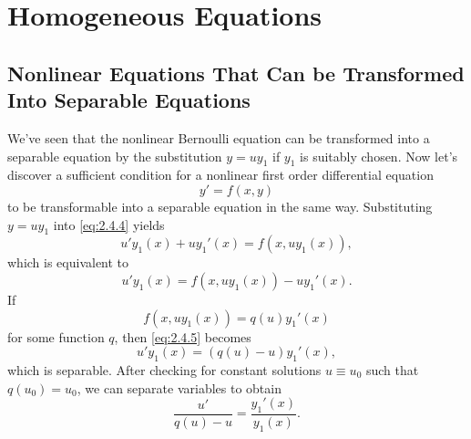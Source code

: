 \documentclass{ximera}
\begin{document}





\section*{Homogeneous Equations}
\subsection*{Nonlinear Equations That Can be  Transformed Into Separable Equations}

We've seen that the nonlinear Bernoulli equation can be transformed
into a separable equation by  the substitution $y=uy_1$ if
$y_1$ is suitably chosen. Now let's discover a sufficient condition
for a nonlinear first order differential equation
\begin{equation} \label{eq:2.4.4}
y'=f(x,y)
\end{equation}
to be transformable into a separable equation in the same way.
  Substituting $y=uy_1$  into
\eqref{eq:2.4.4} yields
$$
u'y_1(x)+uy_1'(x)=f(x,uy_1(x)),
$$
which is equivalent to
\begin{equation} \label{eq:2.4.5}
u'y_1(x)=f(x,uy_1(x))-uy_1'(x).
\end{equation}
If
$$
f(x,uy_1(x))=q(u)y_1'(x)
$$
for some function $q$, then   \eqref{eq:2.4.5} becomes
\begin{equation} \label{eq:2.4.6}
u'y_1(x)=(q(u)-u)y_1'(x),
\end{equation}
which is separable. After checking for constant solutions $u\equiv
u_0$ such that $q(u_0)=u_0$, we can separate
variables to obtain
$$
\frac{u'}{q(u)-u}=\frac{y_1'(x)}{y_1(x)}.
$$
\end{document}
